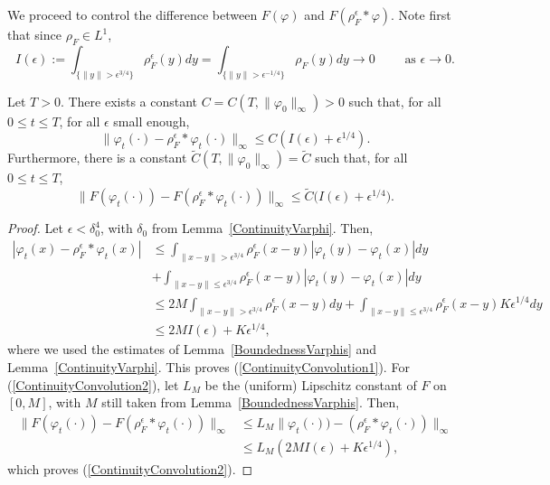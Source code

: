 \documentclass[EJP]{ejpecp} %
\begin{document}
We proceed to control the difference between $F(\varphi)$ and 
$F(\rho^\epsilon_F*\varphi)$. 
Note first that since $\rho_F\in L^1$, 
\[
I(\epsilon):=\int_{\{\|y\|>\epsilon^{3/4}\}}\rho^\epsilon_F(y)dy
=\int_{\{\|y\|>\epsilon^{-1/4}\}}\rho_F(y)dy
\to 0\qquad\mbox{ as }
\epsilon\to 0.
\]

\begin{lemma} 
\label{ContinuityConvolution}
Let $T>0$. There exists a constant 
$C=C(T,\| \varphi_0 \|_\infty)>0$ such that, for all $0 \leq t \leq T$, 
for all $\epsilon$ small enough,
\begin{equation} 
\label{ContinuityConvolution1} 
\| \varphi_t(\cdot) - \rho^\epsilon_F*\varphi_t(\cdot) \|_\infty 
\leq C (I(\epsilon)+\epsilon^{1/4}). 
\end{equation}
Furthermore, there is a constant $\widetilde{C}(T, \| \varphi_0 \|_\infty) = \widetilde{C}$
such that, for all $0 \leq t \leq T$,
\begin{equation} 
\label{ContinuityConvolution2} 
\| F(\varphi_t(\cdot)) - F(\rho^\epsilon_F*\varphi_t(\cdot)) \|_\infty 
\leq \widetilde{C}\big(I(\epsilon)+\epsilon^{1/4}\big). 
\end{equation}
\end{lemma}
\begin{proof}
Let $\epsilon<\delta_0^4$, with $\delta_0$ from Lemma~\ref{ContinuityVarphi}. Then,
\begin{align*}
|\varphi_t(x) - \rho^\epsilon_F*\varphi_t(x)| & \leq 
\int_{\|x-y\| > \epsilon^{3/4} } \rho^\epsilon_F(x-y)|\varphi_t(y)-\varphi_t(x)| dy  \\ 
& + \int_{\|x-y\| \leq \epsilon^{3/4} } \rho^\epsilon_F(x-y)|\varphi_t(y)-\varphi_t(x)| dy \\ 
& \leq 2 M \int_{\|x-y\| > \epsilon^{3/4}  } \rho^\epsilon_F(x-y) dy 
+ \int_{\|x-y\| \leq \epsilon^{3/4}} \rho^\epsilon_F(x-y) K \epsilon^{1/4} dy \\
&\leq 2M I(\epsilon) + K \epsilon^{1/4},
\end{align*}
where we used 
the estimates of Lemma~\ref{BoundednessVarphis}
and Lemma~\ref{ContinuityVarphi}.
This proves (\ref{ContinuityConvolution1}). For (\ref{ContinuityConvolution2}),
let $L_M$ be the (uniform) Lipschitz constant of $F$ on $[0,M]$, with
$M$ still taken from Lemma~\ref{BoundednessVarphis}. Then,
\begin{align*}
 \| F(\varphi_t(\cdot)) - F(\rho^\epsilon_F*\varphi_t(\cdot)) \|_\infty 
&\leq L_M \| \varphi_t(\cdot)) - (\rho^\epsilon_F*\varphi_t(\cdot)) \|_\infty \\ 
& \leq L_M ( 2 M I(\epsilon) + K\epsilon^{1/4}),
\end{align*}
which proves (\ref{ContinuityConvolution2}). 
\end{proof}
\end{document}
